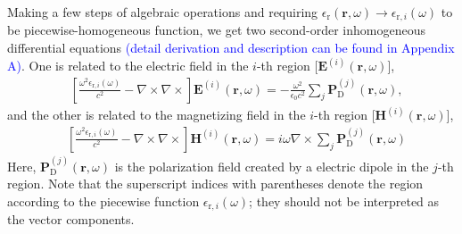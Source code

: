 \documentclass[journal=jacsat,manuscript=article,layout=traditional]{achemso}
\newcommand*\eme{\mathbf{E}}
\newcommand*\emh{\mathbf{H}}
\newcommand*\emp{\mathbf{P}}
\newcommand*\br{\mathbf{r}}
\newcommand*\blue[1]{\textcolor{blue}{#1}}
\begin{document}
Making a few steps of algebraic operations and requiring $\epsilon_\mathrm{r}(\br,\omega)\rightarrow\epsilon_{\mathrm{r},i}(\omega)$ to be piecewise-homogeneous function, we get two second-order inhomogeneous differential equations \blue{(detail derivation and description can be found in Appendix A)}. One is related to the electric field in the $i$-th region [$\mathbf{E}^{(i)}(\br,\omega)$],
\begin{align}
    \label{Eq:InhomoPDEE}
    &\left[\frac{\omega^2\epsilon_{\textrm{r},i}(\omega)}{c^2}-\nabla\times\nabla\times\right]\eme^{(i)}(\br,\omega)
    = -\frac{\omega^2}{\epsilon_0c^2}\sum_j\emp_\textrm{D}^{(j)}(\br,\omega),
\end{align}
and the other is related to the magnetizing field in the $i$-th region [$\emh^{(i)}(\br,\omega)$],
\begin{align}
    &\left[\frac{\omega^2\epsilon_{\textrm{r},i}(\omega)}{c^2}-\nabla\times\nabla\times\right]\emh^{(i)}(\br,\omega)
    = i\omega\nabla\times{\sum_j\emp_\textrm{D}^{(j)}(\br,\omega)}
    \label{Eq:InhomoPDEH}
\end{align}
Here, $\emp_\mathrm{D}^{(j)}(\br,\omega)$ is the polarization field created by a electric dipole in the $j$-th region.
Note that the superscript indices with parentheses denote the region according to the piecewise function $\epsilon_{\mathrm{r},i}(\omega)$; they should not be interpreted as the vector components.
\end{document}
